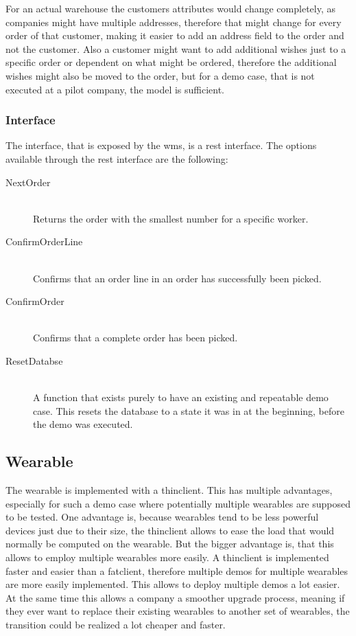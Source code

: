 For an actual warehouse the customers attributes would change completely, as companies might have multiple addresses, therefore that might change for every order of that customer, making it easier to add an address field to the order and not the customer.  Also a customer might want to add additional wishes just to a specific order or dependent on what might be ordered, therefore the additional wishes might also be moved to the order, but for a demo case, that is not executed at a pilot company, the model is sufficient.

\subsubsection{Interface}
The interface, that is exposed by the \gls{wms}, is a \gls{rest} interface. The options available through the \gls{rest} interface are the following:
\begin{description}
	\item[NextOrder] \hfill \\
	Returns the order with the smallest number for a specific worker.
	\item[ConfirmOrderLine] \hfill \\
	Confirms that an order line in an order has successfully been picked.
	\item[ConfirmOrder] \hfill \\
	Confirms that a complete order has been picked.
	\item[ResetDatabse] \hfill \\
	A function that exists purely to have an existing and repeatable demo case. This resets the database to a state it was in at the beginning, before the demo was executed.
\end{description}

\subsection{Wearable}
The wearable is implemented with a \gls{thinclient}. This has multiple advantages, especially for such a demo case where potentially multiple wearables are supposed to be tested. One advantage is, because wearables tend to be less powerful devices just due to their size, the \gls{thinclient} allows to ease the load that would normally be computed on the wearable. But the bigger advantage is, that this allows to employ multiple wearables more easily. A \gls{thinclient} is implemented faster and easier than a \gls{fatclient}, therefore multiple demos for multiple wearables are more easily implemented. This allows to deploy multiple demos a lot easier. At the same time this allows a company a smoother upgrade process, meaning if they ever want to replace their existing wearables to another set of wearables, the transition could be realized a lot cheaper and faster.

